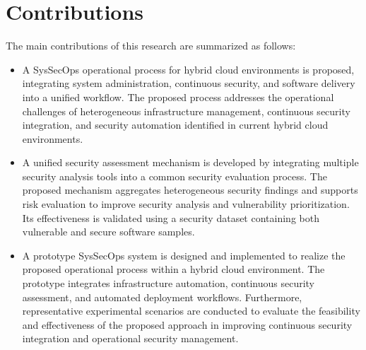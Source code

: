 \section{Contributions}
\label{sec:Contributions}
The main contributions of this research are summarized as follows:

\begin{itemize}

    \item A SysSecOps operational process for hybrid cloud environments is proposed, integrating system administration, continuous security, and software delivery into a unified workflow. The proposed process addresses the operational challenges of heterogeneous infrastructure management, continuous security integration, and security automation identified in current hybrid cloud environments.

    \item A unified security assessment mechanism is developed by integrating multiple security analysis tools into a common security evaluation process. The proposed mechanism aggregates heterogeneous security findings and supports risk evaluation to improve security analysis and vulnerability prioritization. Its effectiveness is validated using a security dataset containing both vulnerable and secure software samples.

    \item A prototype SysSecOps system is designed and implemented to realize the proposed operational process within a hybrid cloud environment. The prototype integrates infrastructure automation, continuous security assessment, and automated deployment workflows. Furthermore, representative experimental scenarios are conducted to evaluate the feasibility and effectiveness of the proposed approach in improving continuous security integration and operational security management.

\end{itemize}